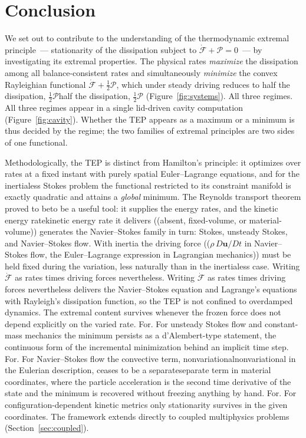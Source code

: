\documentclass[12pt]{article}
\newif\ifhighlight \highlightfalse
\newif\ifhighlightfirst \highlightfirstfalse
\DeclareRobustCommand{\chg}[1]{\ifhighlight\ifhighlightfirst\textcolor{revised}{#1}\else#1\fi\else#1\fi}
\DeclareRobustCommand{\chgb}[1]{\ifhighlight\textcolor{revisedb}{#1}\else#1\fi}
\begin{document}
\section{Conclusion}

We set out to contribute to the understanding of the thermodynamic extremal principle~--- stationarity of the dissipation subject to $\dot{\mathcal{F}} + \mathcal{P} = 0$~--- by investigating its extremal properties. The physical rates \textit{maximize} the dissipation among all balance-consistent rates and simultaneously \textit{minimize} the convex Rayleighian functional $\dot{\mathcal{F}} + \tfrac{1}{2}\mathcal{P}$, which under steady driving reduces to \chg{half the dissipation, $\tfrac{1}{2}\mathcal{P}$} (Figure~\ref{fig:systems})\chg{. All three regimes} appear in a single lid-driven cavity computation (Figure~\ref{fig:cavity}). Whether the TEP \chgb{appears} as a maximum or a minimum is thus decided by the regime; the two families of extremal principles are two \chgb{sides} of one functional.

Methodologically, the TEP is distinct from Hamilton's principle: it optimizes over rates at a fixed instant with purely spatial Euler--Lagrange equations, and for the inertialess Stokes problem the functional restricted to its constraint manifold is exactly quadratic and attains a \textit{global} minimum. The Reynolds transport theorem proved \chg{to be} a useful tool: it supplies the energy rates, and the \chg{kinetic energy rate} it delivers \chg{(}absent, fixed-volume, or material-volume\chg{)} generates the Navier--Stokes family in turn: Stokes, unsteady Stokes, and Navier--Stokes flow. With inertia the driving force \chg{(}$\rho\, D\boldsymbol{u}/Dt$ in Navier--Stokes flow, the Euler--Lagrange expression in Lagrangian mechanics\chg{)} must be held fixed during the variation, less naturally than in the inertialess case\chg{. Writing $\dot{\mathcal{F}}$ as rates times driving forces nevertheless} delivers the Navier--Stokes equation and Lagrange's equations with Rayleigh's dissipation function, so the TEP is not confined to overdamped dynamics. The extremal content survives whenever the frozen force does not depend explicitly on the varied rate\chg{. For} unsteady Stokes flow and constant-mass mechanics the minimum persists as a d'Alembert-type statement, the continuous form of the incremental minimization behind an implicit time step\chg{. For} Navier--Stokes flow the convective term, \chg{nonvariational} in the Eulerian description, ceases to be a \chg{separate} term in material coordinates, where the particle acceleration is the second time derivative of the state and the minimum is recovered without freezing anything by hand\chg{. For} configuration-dependent kinetic metrics only stationarity survives in the given coordinates. The framework extends directly to coupled multiphysics problems (Section~\ref{sec:coupled}).
\end{document}
